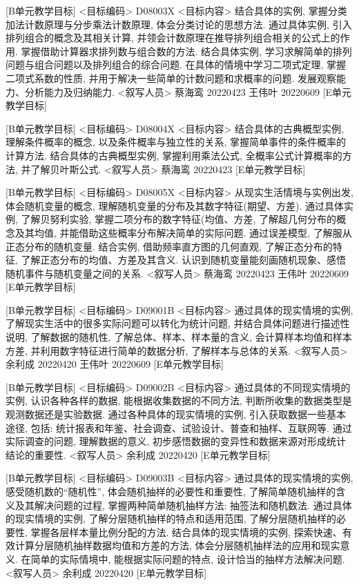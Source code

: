\documentclass[10pt,a4paper]{article}
\begin{document}
[B单元教学目标]
<目标编码>
D08003X
<目标内容>
结合具体的实例, 掌握分类加法计数原理与分步乘法计数原理, 体会分类讨论的思想方法. 通过具体实例, 引入排列组合的概念及其相关计算, 并领会计数原理在推导排列组合相关的公式上的作用. 掌握借助计算器求排列数与组合数的方法. 结合具体实例, 学习求解简单的排列问题与组合问题以及排列组合的综合问题. 在具体的情境中学习二项式定理, 掌握二项式系数的性质, 并用于解决一些简单的计数问题和求概率的问题. 发展观察能力、分析能力及归纳能力.
<叙写人员>
蔡海鸾  20220423
王伟叶  20220609
[E单元教学目标]

[B单元教学目标]
<目标编码>
D08004X
<目标内容>
结合具体的古典概型实例, 理解条件概率的概念, 以及条件概率与独立性的关系, 掌握简单事件的条件概率的计算方法. 结合具体的古典概型实例, 掌握利用乘法公式, 全概率公式计算概率的方法, 并了解贝叶斯公式.
<叙写人员>
蔡海鸾  20220423
[E单元教学目标]

[B单元教学目标]
<目标编码>
D08005X
<目标内容>
从现实生活情境与实例出发, 体会随机变量的概念, 理解随机变量的分布及其数字特征(期望、方差). 通过具体实例, 了解贝努利实验, 掌握二项分布的数字特征(均值、方差, 了解超几何分布的概念及其均值, 并能借助这些概率分布解决简单的实际问题. 通过误差模型, 了解服从正态分布的随机变量. 结合实例, 借助频率直方图的几何直观, 了解正态分布的特征, 了解正态分布的均值、方差及其含义. 认识到随机变量能刻画随机现象、感悟随机事件与随机变量之间的关系.
<叙写人员>
蔡海鸾  20220423
王伟叶  20220609
[E单元教学目标]

[B单元教学目标]
<目标编码>
D09001B
<目标内容>
通过具体的现实情境的实例, 了解现实生活中的很多实际问题可以转化为统计问题, 并结合具体问题进行描述性说明, 了解数据的随机性, 了解总体、样本、样本量的含义, 会计算样本均值和样本方差, 并利用数字特征进行简单的数据分析, 了解样本与总体的关系.
<叙写人员>
余利成  20220420
王伟叶  20220609
[E单元教学目标]

[B单元教学目标]
<目标编码>
D09002B
<目标内容>
通过具体的不同现实情境的实例, 认识各种各样的数据, 能根据收集数据的不同方法, 判断所收集的数据类型是观测数据还是实验数据. 通过各种具体的现实情境的实例, 引入获取数据一些基本途径, 包括: 统计报表和年鉴、社会调查、试验设计、普查和抽样、互联网等. 通过实际调查的问题, 理解数据的意义, 初步感悟数据的变异性和数据来源对形成统计结论的重要性.
<叙写人员>
余利成  20220420
[E单元教学目标]

[B单元教学目标]
<目标编码>
D09003B
<目标内容>
通过具体的现实情境的实例, 感受随机数的“随机性”, 体会随机抽样的必要性和重要性, 了解简单随机抽样的含义及其解决问题的过程, 掌握两种简单随机抽样方法: 抽签法和随机数法. 通过具体的现实情境的实例, 了解分层随机抽样的特点和适用范围, 了解分层随机抽样的必要性, 掌握各层样本量比例分配的方法. 结合具体的现实情境的实例, 探索快速、有效计算分层随机抽样数据均值和方差的方法, 体会分层随机抽样法的应用和现实意义. 在简单的实际情境中, 能根据实际问题的特点, 设计恰当的抽样方法解决问题.
<叙写人员>
余利成  20220420
[E单元教学目标]
\end{document}
